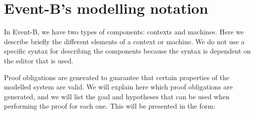 \newcommand{\varlist}[1]{\mathbf{#1}}
\newcommand{\allconstants}{\varlist{c}}
\newcommand{\absvariables}{\varlist{v}}
\newcommand{\concvariables}{\varlist{w}}
\newcommand{\allvariables}{{\absvariables,\concvariables}}
\newcommand{\absparameters}{\varlist{t}}
\newcommand{\concparameters}{\varlist{u}}
\newcommand{\allparameters}{{\absparameters,\concparameters}}
\newcommand{\absbeforeafter}{\mathcal{S}}
\newcommand{\concbeforeafter}{\mathcal{T}}

\newcommand{\axioms}{A(\allconstants)}
\newcommand{\absinvariants}{I(\allconstants,\absvariables)}
\newcommand{\concinvariants}{J(\allconstants,\absvariables,\concvariables)}
\newcommand{\absguards}{G(\allconstants,\absvariables,\absparameters)}
\newcommand{\concguards}{H(\allconstants,\concvariables,\concparameters)}
\newcommand{\witnesspred}{W(\allconstants,\allvariables,\absvariables',\concvariables',\allparameters)}
\newcommand{\bapred}{\concbeforeafter(\allconstants,\concparameters,\concvariables,\concvariables')}

\clearpage

\section{Event-B's modelling notation}
\label{modeling_notation}

In Event-B, we have two types of components: contexts and machines.
Here we describe briefly the different elements of a context or machine.
We do not use a specific syntax for describing the components because the syntax is dependent on the editor that is
used. 

Proof obligations are generated to guarantee that certain properties of the modelled system are valid.
We will explain here which proof obligations are generated, and we will list the goal and hypotheses that can be used
when performing the proof for each one.
This will be presented in the form:

